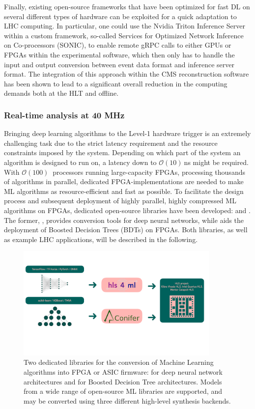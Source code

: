 Finally, existing open-source frameworks that have been optimized for fast DL on several different types of hardware can be exploited for a quick adaptation to LHC computing. In particular, one could use the Nvidia Triton Inference Server within a custom framework, so-called Services for Optimized Network Inference on Co-processors (SONIC), to enable remote gRPC calls to either GPUs or FPGAs within the experimental software, which then only has to handle the input and output conversion between event data format and inference server format. The integration of this approach within the CMS reconstruction software has been shown to lead to a significant overall reduction in the computing demands both at the HLT and offline.

\subsubsection{Real-time analysis at 40 MHz}
Bringing deep learning algorithms to the Level-1 hardware trigger is an extremely challenging task due to the strict latency requirement and the resource constraints imposed by the system. Depending on which part of the system an algorithm is designed to run on, a latency down to $\mathcal{O}(10)~$ns might be required.  
With $\mathcal{O}(100)~$ processors running large-capacity FPGAs, processing thousands of algorithms in parallel, dedicated FPGA-implementations are needed to make ML algorithms as resource-efficient and fast as possible.
To facilitate the design process and subsequent deployment of highly parallel, highly compressed ML algorithms on FPGAs, dedicated open-source libraries have been developed: \hlsfml and \conifer. 
The former, \hlsfml, provides conversion tools for deep neural networks, while \conifer aids the deployment of Boosted Decision Trees (BDTs) on FPGAs. Both libraries, as well as example LHC applications, will be described in the following.
\begin{figure}[htb]
    \centering
    \includegraphics[width=0.89\textwidth]{figures/hls4ml_conifer.pdf}
    \caption{Two dedicated libraries for the conversion of Machine Learning algorithms into FPGA or ASIC firmware: \hlsfml for deep neural network architectures and \conifer for Boosted Decision Tree architectures. Models from a wide range of open-source ML libraries are supported, and may be converted using three different high-level synthesis backends.}
    \label{figs2:libraries}
\end{figure}

